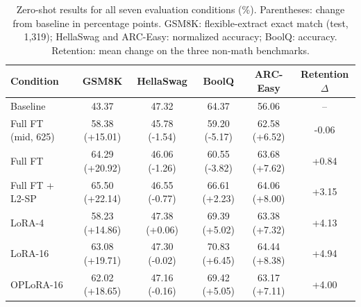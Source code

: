 \begin{table}[t]
\centering
\small
\caption{Zero-shot results for all seven evaluation conditions (\%). Parentheses: change from baseline in percentage points. GSM8K: flexible-extract exact match (test, 1,319); HellaSwag and ARC-Easy: normalized accuracy; BoolQ: accuracy. Retention: mean change on the three non-math benchmarks.}
\label{tab:t1_bench}
\begin{tabular}{lccccc}
\toprule
Condition & GSM8K & HellaSwag & BoolQ & ARC-Easy & Retention $\Delta$ \\
\midrule
Baseline & 43.37 & 47.32 & 64.37 & 56.06 & -- \\
Full FT (mid, 625) & 58.38 (+15.01) & 45.78 (-1.54) & 59.20 (-5.17) & 62.58 (+6.52) & -0.06 \\
Full FT & 64.29 (+20.92) & 46.06 (-1.26) & 60.55 (-3.82) & 63.68 (+7.62) & +0.84 \\
Full FT + L2-SP & 65.50 (+22.14) & 46.55 (-0.77) & 66.61 (+2.23) & 64.06 (+8.00) & +3.15 \\
LoRA-4 & 58.23 (+14.86) & 47.38 (+0.06) & 69.39 (+5.02) & 63.38 (+7.32) & +4.13 \\
LoRA-16 & 63.08 (+19.71) & 47.30 (-0.02) & 70.83 (+6.45) & 64.44 (+8.38) & +4.94 \\
OPLoRA-16 & 62.02 (+18.65) & 47.16 (-0.16) & 69.42 (+5.05) & 63.17 (+7.11) & +4.00 \\
\bottomrule
\end{tabular}
\end{table}
